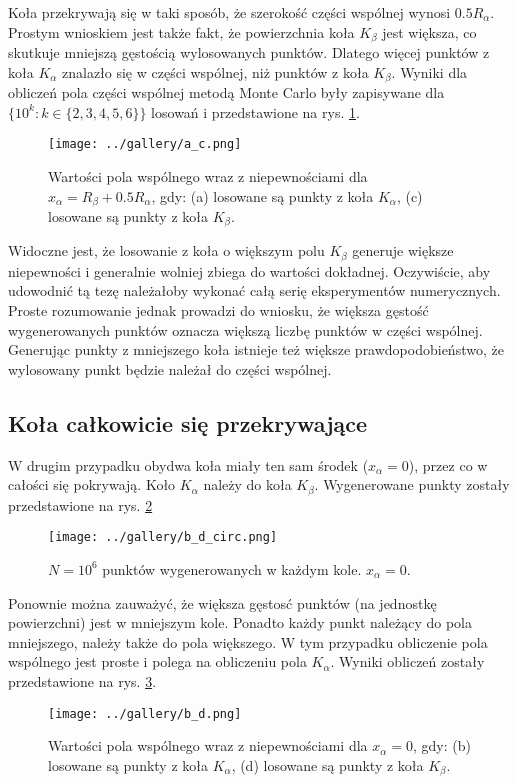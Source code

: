 \documentclass[a4paper, 12pt]{article}
\begin{document}
    \noaka Koła przekrywają się w taki sposób, że szerokość części wspólnej wynosi $0.5R_\alpha$. 
    Prostym wnioskiem jest także fakt, że powierzchnia koła $K_\beta$ jest większa, co skutkuje mniejszą gęstością wylosowanych punktów.
    Dlatego więcej punktów z koła $K_\alpha$ znalazło się w części wspólnej, niż punktów z koła $K_\beta$.
    Wyniki dla obliczeń pola części wspólnej metodą Monte Carlo były zapisywane dla $\{10^k: k \in \{2,3,4,5,6\}\}$ losowań i przedstawione na rys. \ref{fig:ac_mc}.
    \begin{figure}[H]
        \centering
        \texttt{[image: ../gallery/a\_c.png]}
        \caption{Wartości pola wspólnego wraz z niepewnościami dla $x_\alpha = R_\beta + 0.5R_\alpha$, gdy: (a) losowane są punkty z koła $K_\alpha$, (c) losowane są punkty z koła $K_\beta$.}
        \label{fig:ac_mc}
    \end{figure}

    \noaka Widoczne jest, że losowanie z koła o większym polu $K_\beta$ generuje większe niepewności i generalnie wolniej zbiega do wartości dokładnej.
    Oczywiście, aby udowodnić tą tezę należałoby wykonać całą serię eksperymentów numerycznych.
    Proste rozumowanie jednak prowadzi do wniosku, że większa gęstość wygenerowanych punktów oznacza większą liczbę punktów w części wspólnej.
    Generując punkty z mniejszego koła istnieje też większe prawdopodobieństwo, że wylosowany punkt będzie należał do części wspólnej.

    \subsection*{Koła całkowicie się przekrywające}

    W drugim przypadku obydwa koła miały ten sam środek ($x_\alpha = 0$), przez co w całości się pokrywają. 
    Koło $K_\alpha$ należy do koła $K_\beta$. Wygenerowane punkty zostały przedstawione na rys. \ref{fig:bd_circ}
    \begin{figure}[H]
        \centering
        \texttt{[image: ../gallery/b\_d\_circ.png]}
        \caption{$N = 10^6$ punktów wygenerowanych w każdym kole. $x_\alpha =0 $.}
        \label{fig:bd_circ}
    \end{figure}

    \noaka Ponownie można zauważyć, że większa gęstosć punktów (na jednostkę powierzchni) jest w mniejszym kole. 
    Ponadto każdy punkt należący do pola mniejszego, należy także do pola większego.
    W tym przypadku obliczenie pola wspólnego jest proste i polega na obliczeniu pola $K_\alpha$.
    Wyniki obliczeń zostały przedstawione na rys. \ref{fig:bd_mc}.
    \begin{figure}[H]
        \centering
        \texttt{[image: ../gallery/b\_d.png]}
        \caption{Wartości pola wspólnego wraz z niepewnościami dla $x_\alpha = 0$, gdy: (b) losowane są punkty z koła $K_\alpha$, (d) losowane są punkty z koła $K_\beta$.}
        \label{fig:bd_mc}
    \end{figure}
\end{document}
